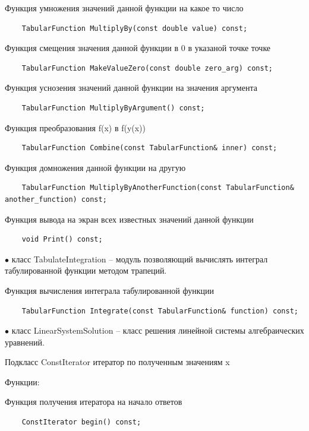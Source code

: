 \documentclass{article}
\theoremstyle{definition}
\theoremstyle{remark}
\begin{document}
Функция умножения значений данной функции на какое то число

\begin{lstlisting}
	TabularFunction MultiplyBy(const double value) const;
\end{lstlisting}


Функция смещения значения данной функции в 0 в указаной точке точке
\begin{lstlisting}
	TabularFunction MakeValueZero(const double zero_arg) const;
\end{lstlisting}

Функция уснозения значений данной функции на значения аргумента
\begin{lstlisting}
	TabularFunction MultiplyByArgument() const;
\end{lstlisting}


Функция преобразования f(x) в f(y(x))
\begin{lstlisting}
	TabularFunction Combine(const TabularFunction& inner) const;
\end{lstlisting}

Функция домножения данной функции на другую
\begin{lstlisting}
	TabularFunction MultiplyByAnotherFunction(const TabularFunction& another_function) const;
\end{lstlisting}

Функция вывода на экран всех известных значений данной функции
\begin{lstlisting}
	void Print() const;
\end{lstlisting}


$\bullet$ класс TabulateIntegration -- модуль позволяющий вычислять интеграл табулированной функции методом трапеций.

Функция вычисления интеграла табулированной функции
\begin{lstlisting}
	TabularFunction Integrate(const TabularFunction& function) const;
\end{lstlisting}

$\bullet$ класс LinearSystemSolution -- класс решения линейной системы алгебраических уравнений.


Подкласс ConstIterator итератор по полученным значениям x

Функции:

Функция получения итератора на начало ответов

\begin{lstlisting}
	ConstIterator begin() const;
\end{lstlisting}
\end{document}
